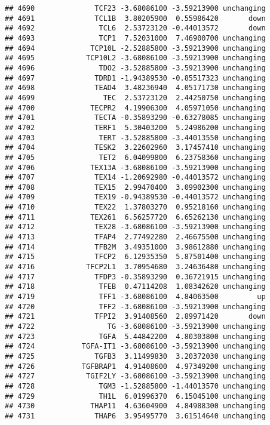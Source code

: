 \documentclass[]{article}
\begin{document}
\begin{verbatim}
## 4690              TCF23 -3.68086100 -3.59213900 unchanging
## 4691              TCL1B  3.80205900  0.55986420       down
## 4692               TCL6  2.53723120 -0.44013572       down
## 4693               TCP1  7.52031000  7.46900700 unchanging
## 4694             TCP10L -2.52885800 -3.59213900 unchanging
## 4695            TCP10L2 -3.68086100 -3.59213900 unchanging
## 4696               TDO2 -3.52885800 -3.59213900 unchanging
## 4697              TDRD1 -1.94389530 -0.85517323 unchanging
## 4698              TEAD4  3.48236940  4.05171730 unchanging
## 4699                TEC  2.53723120  2.44250750 unchanging
## 4700             TECPR2  4.19906300  4.05971050 unchanging
## 4701              TECTA -0.35893290 -0.63278085 unchanging
## 4702              TERF1  5.30403200  5.24986200 unchanging
## 4703               TERT -3.52885800 -3.44013550 unchanging
## 4704              TESK2  3.22602960  3.17457410 unchanging
## 4705               TET2  6.04099800  6.23758360 unchanging
## 4706             TEX13A -3.68086100 -3.59213900 unchanging
## 4707              TEX14 -1.20692980 -0.44013572 unchanging
## 4708              TEX15  2.99470400  3.09902300 unchanging
## 4709              TEX19 -0.94389530 -0.44013572 unchanging
## 4710              TEX22  1.37803270  0.95218160 unchanging
## 4711             TEX261  6.56257720  6.65262130 unchanging
## 4712              TEX28 -3.68086100 -3.59213900 unchanging
## 4713              TFAP4  2.77492280  2.46675500 unchanging
## 4714              TFB2M  3.49351000  3.98612880 unchanging
## 4715              TFCP2  6.12935350  5.87501400 unchanging
## 4716            TFCP2L1  3.70954680  3.24636480 unchanging
## 4717              TFDP3 -0.35893290  0.36721915 unchanging
## 4718               TFEB  0.47114208  1.08342620 unchanging
## 4719               TFF1 -3.68086100  4.84063500         up
## 4720               TFF2 -3.68086100 -3.59213900 unchanging
## 4721              TFPI2  3.91408560  2.89971420       down
## 4722                 TG -3.68086100 -3.59213900 unchanging
## 4723               TGFA  5.44842200  4.80303800 unchanging
## 4724           TGFA-IT1 -3.68086100 -3.59213900 unchanging
## 4725              TGFB3  3.11499830  3.20372030 unchanging
## 4726           TGFBRAP1  4.91408600  4.97349200 unchanging
## 4727            TGIF2LY -3.68086100 -3.59213900 unchanging
## 4728               TGM3 -1.52885800 -1.44013570 unchanging
## 4729               TH1L  6.01996370  6.15045100 unchanging
## 4730             THAP11  4.63604900  4.84988300 unchanging
## 4731              THAP6  3.95495770  3.61514640 unchanging

\end{verbatim}
\end{document}
